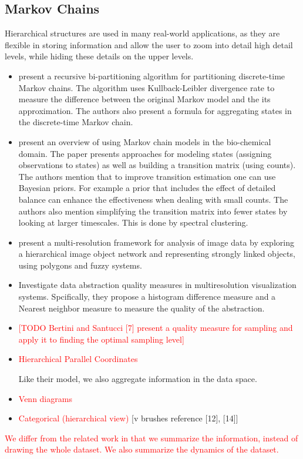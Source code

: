 \subsection{Markov Chains}

Hierarchical structures are used in many real-world applications, as they are flexible in storing information
and allow the user to zoom into detail high detail levels, while hiding these details on the upper levels.

\begin{itemize}
	\item \cite{5746509} present a recursive bi-partitioning algorithm for partitioning discrete-time Markov chains. The 
	algorithm uses Kullback-Leibler divergence rate to measure the difference between the original Markov
	model and the its approximation. The authors also present a formula for aggregating states in the discrete-time
	Markov chain.
	
	\item \cite{pande-beauchamp-bowman:2010:methods:markov-model-review} present an overview of using Markov chain models in the bio-chemical domain. The paper
	presents approaches for modeling states (assigning observations to states) as well as building a transition
	matrix (using counts). The authors mention that to improve transition estimation one can use Bayesian priors.
	For example a prior that includes the effect of detailed balance can enhance the effectiveness when dealing with
	small counts. The authors also mention simplifying the transition matrix into fewer states by looking at larger
	timescales. This is done by spectral clustering.
	
	\item \cite{Benz2004239} present a multi-resolution framework for analysis of image data by exploring a hierarchical
	image object network and representing strongly linked objects, using polygons and fuzzy systems.
	
	\item \cite{4015421} Investigate data abstraction quality measures in multiresolution visualization systems. Spcifically, they propose
	a histogram difference measure and a Nearest neighbor measure to measure the quality of the abstraction.
	
	\item \textcolor{red}{[TODO Bertini and Santucci [7] present a quality measure for sampling and apply it to finding the optimal sampling level]}
	
	\item \textcolor{red}{Hierarchical Parallel Coordinates}
	
	Like their model, we also aggregate information in the data space.
	
	\item \textcolor{red}{Venn diagrams}
	
	\item \textcolor{red}{Categorical (hierarchical view)} [v brushes reference [12], [14]]
\end{itemize}

\textcolor{red}{We differ from the related work in that we summarize the information, instead of drawing the whole
dataset. We also summarize the dynamics of the dataset.}